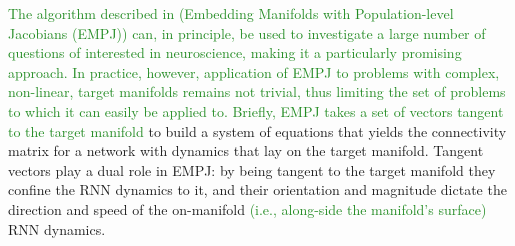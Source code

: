 \textcolor{ForestGreen}{The algorithm described in  (Embedding Manifolds with Population-level
Jacobians (EMPJ)) can, in principle, be used to investigate a large number of questions of interested in neuroscience,
making it a particularly promising approach. In practice, however, application of EMPJ to problems with complex,
non-linear, target manifolds remains not trivial, thus limiting the set of problems to which it can easily be applied
to. Briefly, EMPJ takes a set of vectors tangent to the target manifold} to build a system of equations that yields the
connectivity matrix for a network with dynamics that lay on the target manifold. Tangent vectors play a dual role in
EMPJ: by being tangent to the target manifold they confine the RNN dynamics to it, and their orientation and magnitude
dictate the direction and speed of the on-manifold \textcolor{ForestGreen}{(i.e., along-side the manifold's surface)}
RNN dynamics.
